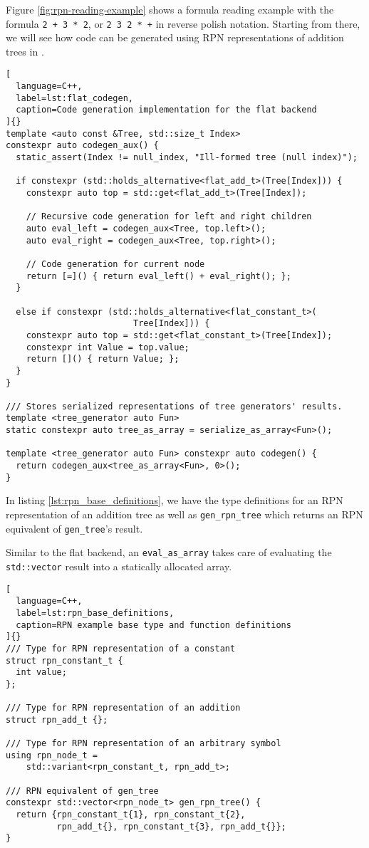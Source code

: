\documentclass[../main]{subfiles}
\begin{document}
Figure \ref{fig:rpn-reading-example} shows a formula reading example with
the formula \lstinline{2 + 3 * 2}, or \lstinline{2 3 2 * +} in
reverse polish notation. Starting from there,
we will see how code can be generated using RPN representations
of addition trees in \cpp.

\begin{lstlisting}[
  language=C++,
  label=lst:flat_codegen,
  caption=Code generation implementation for the flat backend
]{}
template <auto const &Tree, std::size_t Index>
constexpr auto codegen_aux() {
  static_assert(Index != null_index, "Ill-formed tree (null index)");

  if constexpr (std::holds_alternative<flat_add_t>(Tree[Index])) {
    constexpr auto top = std::get<flat_add_t>(Tree[Index]);

    // Recursive code generation for left and right children
    auto eval_left = codegen_aux<Tree, top.left>();
    auto eval_right = codegen_aux<Tree, top.right>();

    // Code generation for current node
    return [=]() { return eval_left() + eval_right(); };
  }

  else if constexpr (std::holds_alternative<flat_constant_t>(
                         Tree[Index])) {
    constexpr auto top = std::get<flat_constant_t>(Tree[Index]);
    constexpr int Value = top.value;
    return []() { return Value; };
  }
}

/// Stores serialized representations of tree generators' results.
template <tree_generator auto Fun>
static constexpr auto tree_as_array = serialize_as_array<Fun>();

template <tree_generator auto Fun> constexpr auto codegen() {
  return codegen_aux<tree_as_array<Fun>, 0>();
}
\end{lstlisting}

\clearpage%

In listing \ref{lst:rpn_base_definitions}, we have the type definitions for an
RPN representation of an addition tree as well as \lstinline{gen_rpn_tree} which
returns an RPN equivalent of \lstinline{gen_tree}'s result.

Similar to the flat backend, an \lstinline{eval_as_array} takes care
of evaluating the \lstinline{std::vector} result into a statically
allocated array.

\begin{lstlisting}[
  language=C++,
  label=lst:rpn_base_definitions,
  caption=RPN example base type and function definitions
]{}
/// Type for RPN representation of a constant
struct rpn_constant_t {
  int value;
};

/// Type for RPN representation of an addition
struct rpn_add_t {};

/// Type for RPN representation of an arbitrary symbol
using rpn_node_t =
    std::variant<rpn_constant_t, rpn_add_t>;

/// RPN equivalent of gen_tree
constexpr std::vector<rpn_node_t> gen_rpn_tree() {
  return {rpn_constant_t{1}, rpn_constant_t{2},
          rpn_add_t{}, rpn_constant_t{3}, rpn_add_t{}};
}
\end{lstlisting}
\end{document}
